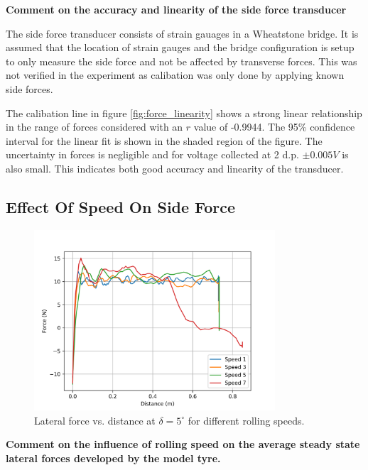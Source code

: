 \documentclass{article}
\begin{document}
\begin{center}
    \textbf{Comment on the accuracy and linearity of the side force transducer}
\end{center}

The side force transducer consists of strain gauages in a Wheatstone bridge.
It is assumed that the location of strain gauges and the bridge configuration is setup to only measure the side force and not be affected by transverse forces.
This was not verified in the experiment as calibation was only done by applying known side forces.

The calibation line in figure \ref{fig:force_linearity} shows a strong linear relationship in the range of forces considered with an $r$ value of -0.9944.
The 95\% confidence interval for the linear fit is shown in the shaded region of the figure.
The uncertainty in forces is negligible and for voltage collected at 2 d.p. $\pm 0.005 V$ is also small.
This indicates both good accuracy and linearity of the transducer.

\subsection{\textbf{Effect Of Speed On Side Force}}

\begin{figure}[H]
    \centering
    \includegraphics[width=0.8\textwidth]{4.2/force_distances.png}
    \caption{Lateral force vs. distance at $\delta = 5^\circ$ for different rolling speeds.}
    \label{fig:lateral_force_distance_speed}
\end{figure}

\begin{center}
    \textbf{Comment on the influence of rolling speed on the average steady state lateral forces
    developed by the model tyre.}
\end{center}
\end{document}
